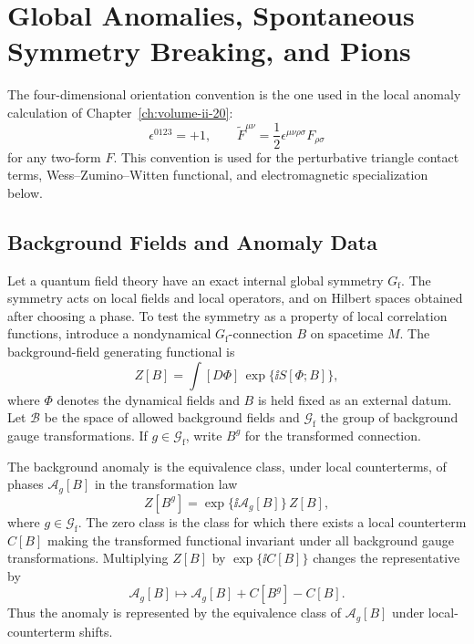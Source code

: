 \chapter{Global Anomalies, Spontaneous Symmetry Breaking, and Pions}
\label{ch:volume-ii-21}
\ConventionsLorentzian


The four-dimensional orientation convention is the one used in the local
anomaly calculation of Chapter~\ref{ch:volume-ii-20}:
\[
  \epsilon^{0123}=+1,
  \qquad
  \widetilde F^{\mu\nu}
  =
  \frac12\epsilon^{\mu\nu\rho\sigma}F_{\rho\sigma}
\]
for any two-form \(F\).  This convention is used for the perturbative triangle
contact terms, Wess--Zumino--Witten functional, and electromagnetic
specialization below.

\section{Background Fields and Anomaly Data}

Let a quantum field theory have an exact internal global symmetry
\(G_{\mathrm f}\).  The symmetry acts on local fields and local operators, and
on Hilbert spaces obtained after choosing a phase.  To test the symmetry as a
property of local correlation functions, introduce a nondynamical
\(G_{\mathrm f}\)-connection \(B\) on spacetime \(M\).  The background-field
generating functional is
\[
  Z[B]
  =
  \int [D\Phi]\,
  \exp\{\ii S[\Phi;B]\},
\]
where \(\Phi\) denotes the dynamical fields and \(B\) is held fixed as an
external datum.
Let \(\mathcal B\) be the space of allowed background fields and
\(\mathcal G_{\mathrm f}\) the group of background gauge transformations.  If
\(g\in\mathcal G_{\mathrm f}\), write \(B^g\) for the transformed connection.

\begin{definition}
\label{def:background-anomaly-cocycle}
The background anomaly is the equivalence class, under local counterterms, of
phases
\(\mathcal A_g[B]\) in the transformation law
\begin{equation}
  Z[B^g]
  =
  \exp\{\ii\mathcal A_g[B]\}\,Z[B],
  \label{eq:finite-background-anomaly}
\end{equation}
where \(g\in\mathcal G_{\mathrm f}\).  The zero class is the class for which
there exists a local counterterm \(C[B]\) making the transformed functional
invariant under all background gauge transformations.  Multiplying \(Z[B]\) by
\(\exp\{\ii C[B]\}\) changes the representative by
\[
  \mathcal A_g[B]
  \longmapsto
  \mathcal A_g[B]+C[B^g]-C[B].
\]
Thus the anomaly is represented by the equivalence class of
\(\mathcal A_g[B]\) under local-counterterm shifts.
\end{definition}

